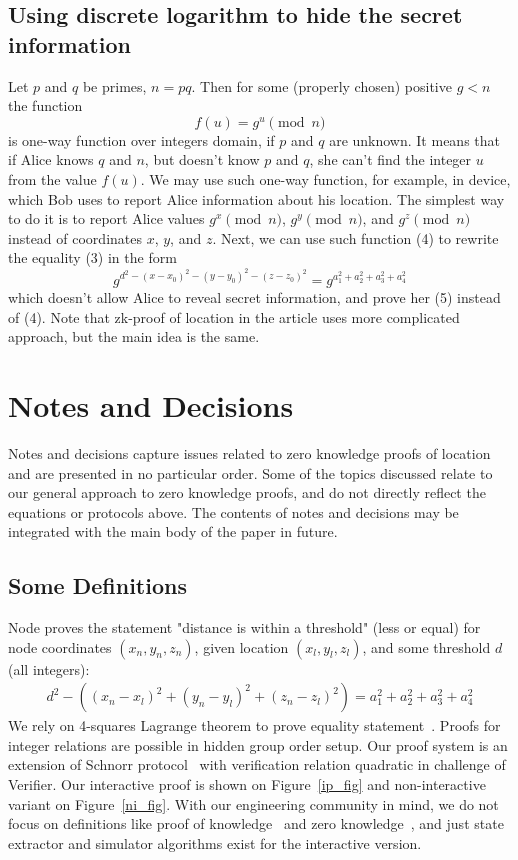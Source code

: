 \documentclass{article}
\begin{document}
\subsection{Using discrete logarithm to hide the secret information}  %
Let $p$ and $q$ be primes, $n= pq$.
Then for some (properly chosen) positive $g < n$ the function
\begin{equation}
  f(u) = g^u \pmod{n}
\end{equation}
is one-way function over integers domain, if $p$ and $q$ are unknown.
It means that if Alice knows $q$ and $n$, but doesn’t know $p$ and $q$,
she can’t find the integer $u$ from the value $f(u)$.
We may use such one-way function, for example, in device, which Bob uses to report Alice information about his location.
The simplest way to do it is to report Alice values $g^x \pmod{n}$, $g^y \pmod{n}$, and $g^z \pmod{n}$
instead of coordinates $x$, $y$, and $z$.
Next, we can use such function (4) to rewrite the equality (3) in the form
\begin{equation}
  g^{d^2 - (x - x_0)^2 - (y - y_0)^2 - (z - z_0)^2} = g^{a_1^2 + a_2^2 + a_3^2 + a_4^2}
\end{equation}
which doesn’t allow Alice to reveal secret information, and prove her (5) instead of (4).
Note that zk-proof of location in the article uses more complicated approach, but the main idea is the same.

\section{Notes and Decisions}

Notes and decisions capture issues related to zero knowledge proofs of location and are presented in no particular order.
Some of the topics discussed relate to our general approach to zero knowledge proofs, and do not directly reflect the equations or protocols above.
The contents of notes and decisions may be integrated with the main body of the paper in future. 


\subsection{Some Definitions}
\label{sect-definitions}
Node proves the statement "distance is within a threshold" (less or equal)
for node coordinates $(x_n, y_n, z_n)$,
given location $(x_l, y_l, z_l)$,
and some threshold $d$ (all integers):
\begin{gather}
\label{eq-distn-cp}
  d^2 - ((x_n - x_l)^2 + (y_n - y_l)^2 + (z_n - z_l)^2) = a_1^2 + a_2^2 + a_3^2 + a_4^2
\end{gather}
We rely on 4-squares Lagrange theorem to prove equality statement~\cite{Lipmaa03}.
Proofs for integer relations are possible in hidden group order setup.
Our proof system is an extension of Schnorr protocol~\cite{Schnorr91}
with verification relation quadratic in challenge of Verifier.
Our interactive proof is shown on Figure~\ref{ip_fig}
and non-interactive variant on Figure~\ref{ni_fig}.
With our engineering community in mind, we do not focus on definitions like
proof of knowledge~\cite{BellarePoK}
and zero knowledge~\cite{Goldwasser85,GMW},
and just state extractor and simulator algorithms exist for the interactive version.
\end{document}
